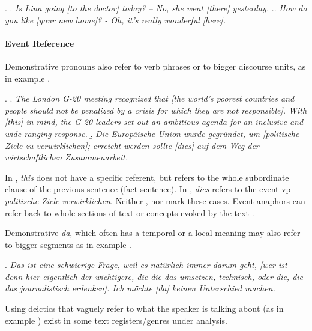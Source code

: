 \documentclass[a4paper]{article}
\begin{document}
\ex.
\a. {\sl Is Lina going [to the doctor] today? -- No, she went [there] yesterday.}
\b.. {\sl How do you like [your new home]? - Oh, it's really wonderful [here].}

\paragraph*{Event Reference}

Demonstrative pronouns also refer to verb phrases or to bigger discourse units, as in example \Next. 

\ex.
\a. {\sl The London G-20 meeting recognized that [the world's poorest countries and people should not be penalized by a crisis for which they are not responsible]. With [this] in mind, the G-20 leaders set out an ambitious agenda for an inclusive and wide-ranging response.}
\b. {\sl Die Europäische Union wurde gegründet, um [politische Ziele zu verwirklichen]; erreicht werden sollte [dies] auf dem Weg der wirtschaftlichen Zusammenarbeit.}

In \Last[a], {\sl this} does not have a specific referent, but refers to the whole subordinate clause of the previous sentence (fact sentence). In \Last[b], {\sl dies} refers to the event-vp {\sl politische Ziele verwirklichen}. Neither \cite{GrishinaStedeGuide}, nor \cite{GuillouEtAlGuide} mark these cases. Event anaphors can refer back to whole sections of text or concepts evoked by the text \cite[p. 8]{GuillouEtAlGuide}. 


Demonstrative {\sl da}, which often has a temporal or a local meaning may also refer to bigger segments as in example \Next.

\ex.
{\sl Das ist eine schwierige Frage, weil es natürlich immer darum geht, [wer ist denn hier eigentlich der wichtigere, die die das umsetzen, technisch, oder die, die das journalistisch erdenken]. Ich möchte [da] keinen Unterschied machen.}

Using deictics that vaguely refer to what the speaker is talking about (as in example \Next) exist in some text registers/genres under analysis. 
\end{document}
